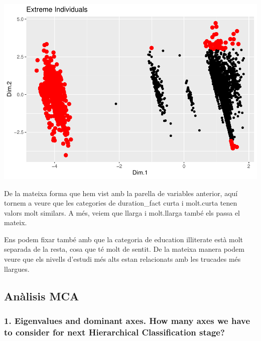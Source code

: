 \documentclass[
]{article}
\newenvironment{Shaded}{\begin{snugshade}}{\end{snugshade}}
\newcommand{\AttributeTok}[1]{\textcolor[rgb]{0.77,0.63,0.00}{#1}}
\newcommand{\DecValTok}[1]{\textcolor[rgb]{0.00,0.00,0.81}{#1}}
\newcommand{\FunctionTok}[1]{\textcolor[rgb]{0.00,0.00,0.00}{#1}}
\newcommand{\NormalTok}[1]{#1}
\newcommand{\OtherTok}[1]{\textcolor[rgb]{0.56,0.35,0.01}{#1}}
\newcommand{\SpecialCharTok}[1]{\textcolor[rgb]{0.00,0.00,0.00}{#1}}
\newcommand{\StringTok}[1]{\textcolor[rgb]{0.31,0.60,0.02}{#1}}
\begin{document}
\includegraphics{Entrega2_files/figure-latex/unnamed-chunk-8-1.pdf}

De la mateixa forma que hem vist amb la parella de variables anterior,
aquí tornem a veure que les categories de duration\_fact curta i
molt.curta tenen valors molt similars. A més, veiem que llarga i
molt.llarga també els passa el mateix.

Ens podem fixar també amb que la categoria de education illiterate està
molt separada de la resta, cosa que té molt de sentit. De la mateixa
manera podem veure que els nivells d'estudi més alts estan relacionats
amb les trucades més llargues.

\hypertarget{anuxe0lisis-mca}{%
\subsection{Anàlisis MCA}\label{anuxe0lisis-mca}}

\begin{Shaded}
\end{Shaded}

\hypertarget{eigenvalues-and-dominant-axes.-how-many-axes-we-have-to-consider-for-next-hierarchical-classification-stage}{%
\subsubsection{1. Eigenvalues and dominant axes. How many axes we have
to consider for next Hierarchical Classification
stage?}\label{eigenvalues-and-dominant-axes.-how-many-axes-we-have-to-consider-for-next-hierarchical-classification-stage}}
\end{document}
